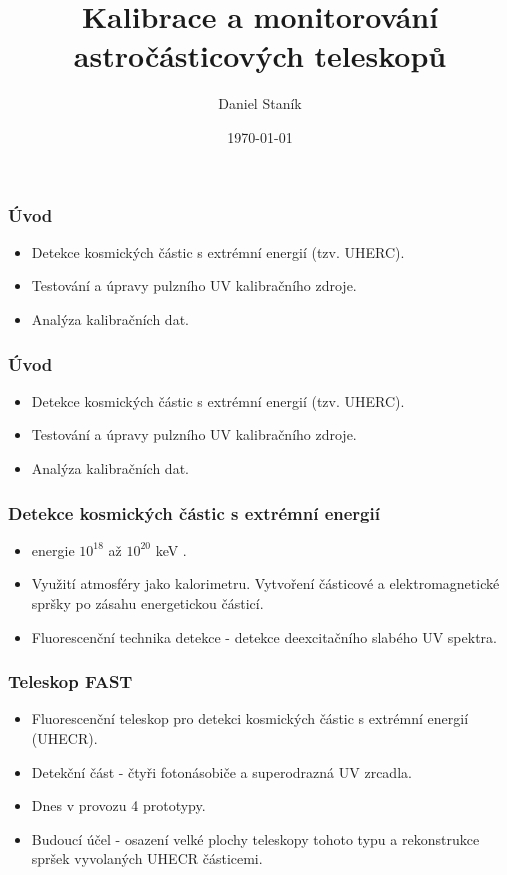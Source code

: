 \documentclass{beamer}
\title{Kalibrace a monitorování astročásticových teleskopů}
\author{Daniel Staník}
\institute{
SLO UPOL}
\date{\today}
\begin{document}
\begin{frame}
\titlepage
\end{frame}



\begin{frame}
\frametitle{Úvod}
\begin{itemize}
 \item Detekce kosmických částic s extrémní energií (tzv. UHERC).
 \item Testování a úpravy pulzního UV kalibračního zdroje.
 \item Analýza kalibračních dat.
\end{itemize}

\end{frame}



\begin{frame}
\frametitle{Úvod}
\begin{itemize}
 \item Detekce kosmických částic s extrémní energií (tzv. UHERC).
 \item Testování a úpravy pulzního UV kalibračního zdroje.
 \item Analýza kalibračních dat.
\end{itemize}

\end{frame}



\begin{frame}
\frametitle{Detekce kosmických částic s extrémní energií}
\begin{itemize}
 \item energie $10^{18}$ až $10^{20}$ keV .
 \item Využití atmosféry jako kalorimetru. Vytvoření částicové a elektromagnetické spršky po zásahu energetickou částicí.
 \item Fluorescenční technika detekce - detekce deexcitačního slabého UV spektra.
\end{itemize}

\end{frame}





\begin{frame}
\frametitle{Teleskop FAST}
\begin{itemize}
 \item Fluorescenční teleskop pro detekci kosmických částic s extrémní energií (UHECR).
 \item Detekční část - čtyři fotonásobiče a superodrazná UV zrcadla.
 \item Dnes v provozu 4 prototypy.
 \item Budoucí účel - osazení velké plochy teleskopy tohoto typu a rekonstrukce spršek vyvolaných UHECR částicemi.
\end{itemize}

\end{frame}
\end{document}
